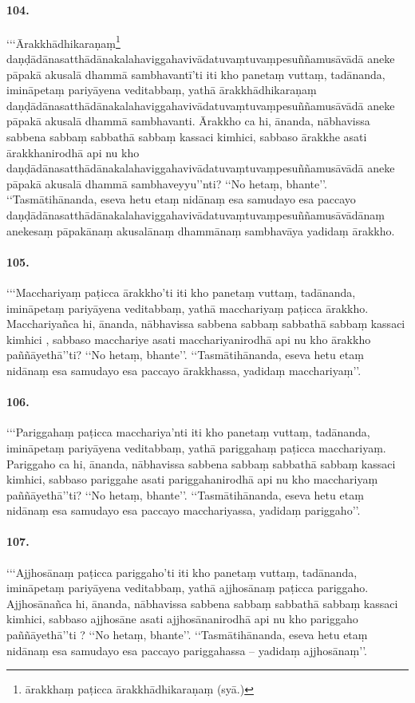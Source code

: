 \paragraph{104.} ‘‘‘Ārakkhādhikaraṇaṃ\footnote{ārakkhaṃ paṭicca ārakkhādhikaraṇaṃ (syā.)} daṇḍādānasatthādānakalahaviggahavivādatuvaṃtuvaṃpesuññamusāvādā aneke pāpakā akusalā dhammā sambhavantī’ti iti kho panetaṃ vuttaṃ, tadānanda, imināpetaṃ pariyāyena veditabbaṃ, yathā ārakkhādhikaraṇaṃ daṇḍādānasatthādānakalahaviggahavivādatuvaṃtuvaṃpesuññamusāvādā aneke pāpakā akusalā dhammā sambhavanti. Ārakkho ca hi, ānanda, nābhavissa sabbena sabbaṃ sabbathā sabbaṃ kassaci kimhici, sabbaso ārakkhe asati ārakkhanirodhā api nu kho daṇḍādānasatthādānakalahaviggahavivādatuvaṃtuvaṃpesuññamusāvādā aneke pāpakā akusalā dhammā sambhaveyyu’’nti? ‘‘No hetaṃ, bhante’’. ‘‘Tasmātihānanda, eseva hetu etaṃ nidānaṃ esa samudayo esa paccayo daṇḍādānasatthādānakalahaviggahavivādatuvaṃtuvaṃpesuññamusāvādānaṃ anekesaṃ pāpakānaṃ akusalānaṃ dhammānaṃ sambhavāya yadidaṃ ārakkho.

\paragraph{105.} ‘‘‘Macchariyaṃ paṭicca ārakkho’ti iti kho panetaṃ vuttaṃ, tadānanda, imināpetaṃ pariyāyena veditabbaṃ, yathā macchariyaṃ paṭicca ārakkho. Macchariyañca hi, ānanda, nābhavissa sabbena sabbaṃ sabbathā sabbaṃ kassaci kimhici , sabbaso macchariye asati macchariyanirodhā api nu kho ārakkho paññāyethā’’ti? ‘‘No hetaṃ, bhante’’. ‘‘Tasmātihānanda, eseva hetu etaṃ nidānaṃ esa samudayo esa paccayo ārakkhassa, yadidaṃ macchariyaṃ’’.

\paragraph{106.} ‘‘‘Pariggahaṃ paṭicca macchariya’nti iti kho panetaṃ vuttaṃ, tadānanda, imināpetaṃ pariyāyena veditabbaṃ, yathā pariggahaṃ paṭicca macchariyaṃ. Pariggaho ca hi, ānanda, nābhavissa sabbena sabbaṃ sabbathā sabbaṃ kassaci kimhici, sabbaso pariggahe asati pariggahanirodhā api nu kho macchariyaṃ paññāyethā’’ti? ‘‘No hetaṃ, bhante’’. ‘‘Tasmātihānanda, eseva hetu etaṃ nidānaṃ esa samudayo esa paccayo macchariyassa, yadidaṃ pariggaho’’.

\paragraph{107.} ‘‘‘Ajjhosānaṃ paṭicca pariggaho’ti iti kho panetaṃ vuttaṃ, tadānanda, imināpetaṃ pariyāyena veditabbaṃ, yathā ajjhosānaṃ paṭicca pariggaho. Ajjhosānañca hi, ānanda, nābhavissa sabbena sabbaṃ sabbathā sabbaṃ kassaci kimhici, sabbaso ajjhosāne asati ajjhosānanirodhā api nu kho pariggaho paññāyethā’’ti ? ‘‘No hetaṃ, bhante’’. ‘‘Tasmātihānanda, eseva hetu etaṃ nidānaṃ esa samudayo esa paccayo pariggahassa – yadidaṃ ajjhosānaṃ’’.

